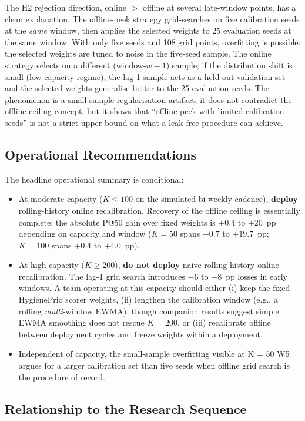 The H2 rejection direction, online $>$ offline at several late-window
points, has a clean explanation. The offline-peek strategy grid-searches
on five calibration seeds at the \textit{same} window, then applies the
selected weights to 25 evaluation seeds at the same window. With only
five seeds and 108 grid points, overfitting is possible: the selected
weights are tuned to noise in the five-seed sample. The online strategy
selects on a different (window-$w-1$) sample; if the distribution shift
is small (low-capacity regime), the lag-1 sample acts as a held-out
validation set and the selected weights generalise better to the 25
evaluation seeds. The phenomenon is a small-sample regularisation
artifact; it does not contradict the offline ceiling concept, but it
shows that ``offline-peek with limited calibration seeds'' is not a
strict upper bound on what a leak-free procedure can achieve.

\subsection{Operational Recommendations}

The headline operational summary is conditional:
\begin{itemize}
\item At moderate capacity ($K \leq 100$ on the simulated bi-weekly
cadence), \textbf{deploy} rolling-history online recalibration. Recovery
of the offline ceiling is essentially complete; the absolute P@50 gain
over fixed weights is $+0.4$ to $+20$~pp depending on capacity and
window ($K = 50$ spans $+0.7$ to $+19.7$~pp; $K = 100$ spans $+0.4$
to $+4.0$~pp).
\item At high capacity ($K \geq 200$), \textbf{do not deploy} naive
rolling-history online recalibration. The lag-1 grid search introduces
$-6$ to $-8$~pp losses in early windows. A team operating at this
capacity should either (i) keep the fixed HygienePrio scorer weights, (ii) lengthen
the calibration window (e.g., a rolling \textit{multi}-window
EWMA), though companion results suggest simple EWMA smoothing does
not rescue $K = 200$, or (iii) recalibrate offline between
deployment cycles and freeze weights within a deployment.
\item Independent of capacity, the small-sample overfitting visible
at K = 50 W5 argues for a larger calibration set than five seeds
when offline grid search is the procedure of record.
\end{itemize}

\subsection{Relationship to the Research Sequence}

